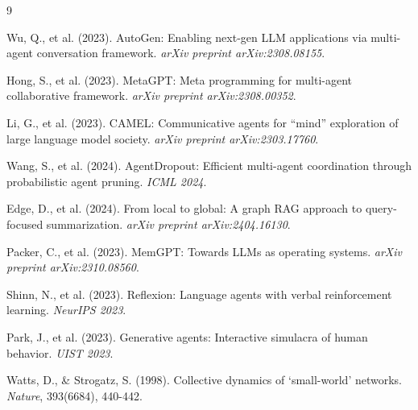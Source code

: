 \documentclass[11pt]{article}
\begin{document}

\begin{thebibliography}{9}

Wu, Q., et al. (2023). AutoGen: Enabling next-gen LLM applications via multi-agent conversation framework. \textit{arXiv preprint arXiv:2308.08155}.

Hong, S., et al. (2023). MetaGPT: Meta programming for multi-agent collaborative framework. \textit{arXiv preprint arXiv:2308.00352}.

Li, G., et al. (2023). CAMEL: Communicative agents for ``mind'' exploration of large language model society. \textit{arXiv preprint arXiv:2303.17760}.

Wang, S., et al. (2024). AgentDropout: Efficient multi-agent coordination through probabilistic agent pruning. \textit{ICML 2024}.

Edge, D., et al. (2024). From local to global: A graph RAG approach to query-focused summarization. \textit{arXiv preprint arXiv:2404.16130}.

Packer, C., et al. (2023). MemGPT: Towards LLMs as operating systems. \textit{arXiv preprint arXiv:2310.08560}.

Shinn, N., et al. (2023). Reflexion: Language agents with verbal reinforcement learning. \textit{NeurIPS 2023}.

Park, J., et al. (2023). Generative agents: Interactive simulacra of human behavior. \textit{UIST 2023}.

Watts, D., \& Strogatz, S. (1998). Collective dynamics of `small-world' networks. \textit{Nature}, 393(6684), 440-442.

\end{thebibliography}
\end{document}
